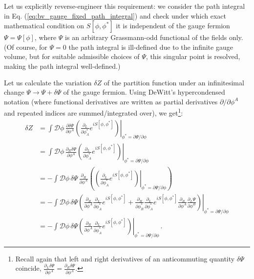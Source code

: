 Let us explicitly reverse-engineer this requirement: we consider the path integral in Eq. (\ref{eq:bv_gauge_fixed_path_integral}) and check under which exact mathematical condition on \(S[\phi, \phi^*]\) it is independent of the gauge fermion \(\Psi = \Psi[\phi]\), where \(\Psi\) is an arbitrary Grassmann-odd functional of the fields only. (Of course, for \(\Psi = 0\) the path integral is ill-defined due to the infinite gauge volume, but for suitable admissible choices of \(\Psi\), this singular point is resolved, making the path integral well-defined.)

Let us calculate the variation \(\delta Z\) of the partition function under an infinitesimal change \(\Psi \rightarrow \Psi + \delta\Psi\) of the gauge fermion. Using DeWitt's hypercondensed notation (where functional derivatives are written as partial derivatives \(\partial / \partial \phi^A\) and repeated indices are summed/integrated over), we get\footnote{Recall again that left and right derivatives of an anticommuting quantity \(\delta\Psi\) coincide, \(\frac{\partial_L \delta\Psi}{\partial \phi^A} = \frac{\partial_R \delta\Psi}{\partial \phi^A}\).}:
\begin{equation} \label{eq:bv_delta_z_derivation}
    \begin{aligned}
        \delta Z & = \int \mathcal{D}\phi \, \frac{\partial \delta\Psi}{\partial \phi^A} \left. \left( \frac{\partial_L}{\partial \phi_A^*} e^{iS[\phi, \phi^*]} \right) \right|_{\phi^* = \partial\Psi / \partial\phi}                                                                                                                                                                                \\
                 & = \int \mathcal{D}\phi \, \frac{\partial_R \delta\Psi}{\partial \phi^A} \left. \left( \frac{\partial_L}{\partial \phi_A^*} e^{iS[\phi, \phi^*]} \right) \right|_{\phi^* = \partial\Psi / \partial\phi}                                                                                                                                                                              \\
                 & = -\int \mathcal{D}\phi \, \delta\Psi \, \frac{\partial_R}{\partial \phi^A} \left( \left. \left( \frac{\partial_L}{\partial \phi_A^*} e^{iS[\phi, \phi^*]} \right) \right|_{\phi^* = \partial\Psi / \partial\phi} \right)                                                                                                                                                           \\
                 & = -\int \mathcal{D}\phi \, \delta\Psi \left. \left( \frac{\partial_R}{\partial \phi^A} \frac{\partial_L}{\partial \phi_A^*} e^{iS[\phi, \phi^*]} + \frac{\partial_R}{\partial \phi_B^*} \frac{\partial_L}{\partial \phi_A^*} e^{iS[\phi, \phi^*]} \frac{\partial_R}{\partial \phi^A} \frac{\partial_L \Psi}{\partial \phi^B} \right) \right|_{\phi^* = \partial\Psi / \partial\phi} \\
                 & = -\int \mathcal{D}\phi \, \delta\Psi \left. \left( \frac{\partial_R}{\partial \phi^A} \frac{\partial_L}{\partial \phi_A^*} e^{iS[\phi, \phi^*]} \right) \right|_{\phi^* = \partial\Psi / \partial\phi} \, .
    \end{aligned}
\end{equation}
